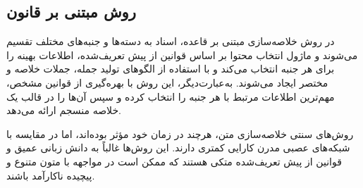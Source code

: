 \subsection{روش مبتنی بر قانون }


در روش خلاصه‌سازی مبتنی بر قاعده، اسناد به دسته‌ها و جنبه‌های مختلف تقسیم می‌شوند و ماژول انتخاب محتوا بر اساس قوانین از پیش تعریف‌شده، اطلاعات بهینه را برای هر جنبه انتخاب می‌کند و با استفاده از الگوهای تولید جمله، جملات خلاصه و مختصر ایجاد می‌شوند. به‌عبارت‌دیگر، این روش با بهره‌گیری از قوانین مشخص، مهم‌ترین اطلاعات مرتبط با هر جنبه را انتخاب کرده و سپس آن‌ها را در قالب یک خلاصه منسجم ارائه می‌دهد\cite{Moratanchsurvey}.




% 
روش‌های سنتی خلاصه‌سازی متن، هرچند در زمان خود مؤثر بوده‌اند، اما در مقایسه با شبکه‌های عصبی مدرن کارایی کمتری دارند. این روش‌ها غالباً به دانش زبانی عمیق و قوانین از پیش تعریف‌شده متکی هستند که ممکن است در مواجهه با متون متنوع و پیچیده ناکارآمد باشند.









